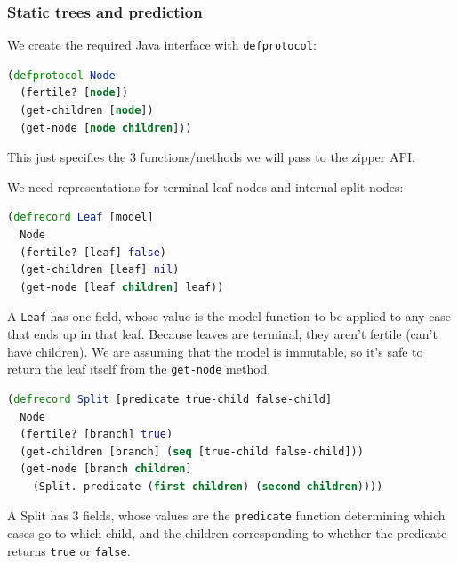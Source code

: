 \documentclass[10pt,openany]{article}
\numberwithin{definition}{section}
\numberwithin{example}{section}
\numberwithin{equation}{section}
\numberwithin{figure}{section}
\begin{document}
\subsubsection{Static trees and prediction}

We create the required Java interface with \texttt{defprotocol}:

\begin{minipage}[t]{1\columnwidth}%
\begin{lstlisting}[caption={Tree node protocol},label={lis:node-protocol},language=clojure,tabsize=2]
(defprotocol Node
  (fertile? [node])
  (get-children [node])
  (get-node [node children])) 
\end{lstlisting}
%
\end{minipage}

This just specifies the 3 functions/methods we will pass to the zipper
API. 

We need representations for terminal leaf nodes and internal split
nodes:

\begin{minipage}[t]{1\columnwidth}%
\begin{lstlisting}[caption={Leaf nodes},label={lis:leaf-defrecord},language=clojure,tabsize=2]
(defrecord Leaf [model]
  Node
  (fertile? [leaf] false)
  (get-children [leaf] nil)
  (get-node [leaf children] leaf)) 
\end{lstlisting}
%
\end{minipage}

A \texttt{Leaf} has one field, whose value is the model function to
be applied to any case that ends up in that leaf. Because leaves are
terminal, they aren't fertile (can't have children). We are assuming
that the model is immutable, so it's safe to return the leaf itself
from the \texttt{get-node} method. 

\begin{minipage}[t]{1\columnwidth}%
\begin{lstlisting}[caption={Split nodes},label={lis:split-defrecord},language=clojure,tabsize=2]
(defrecord Split [predicate true-child false-child]
  Node
  (fertile? [branch] true)
  (get-children [branch] (seq [true-child false-child]))
  (get-node [branch children] 
    (Split. predicate (first children) (second children)))) 
\end{lstlisting}
%
\end{minipage}

A Split has 3 fields, whose values are the \texttt{predicate} function
determining which cases go to which child, and the children corresponding
to whether the predicate returns \texttt{true} or \texttt{false}. 
\end{document}
